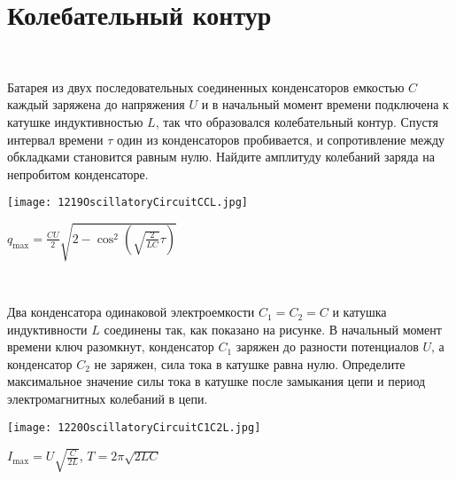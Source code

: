 \section{Колебательный контур}

\begin{ex}
\hspace{0pt} \\
\begin{minipage}{.65\textwidth}
Батарея из двух последовательных соединенных конденсаторов емкостью $C$ каждый заряжена до напряжения $U$ и в начальный момент времени подключена к катушке индуктивностью $L$, так что образовался колебательный контур. 
Спустя интервал времени $\tau$ один из конденсаторов пробивается, и сопротивление между обкладками становится равным нулю. 
Найдите амплитуду колебаний заряда на непробитом конденсаторе.
\end{minipage}
\begin{minipage}{.35\textwidth}
\centering
\texttt{[image: 1219OscillatoryCircuitCCL.jpg]}
\end{minipage}
\begin{ans}
$q_{\max} = \frac{CU}{2}\sqrt{2-\cos^2 \left( \sqrt{\frac{2}{LC}} \tau \right)}$
\end{ans}
\end{ex}

\begin{ex}
\hspace{0pt} \\
\begin{minipage}{.65\textwidth}
 Два конденсатора одинаковой электроемкости $C_1 = C_2 = C$ и катушка индуктивности $L$ соединены так, как показано на рисунке. 
В начальный момент времени ключ разомкнут, конденсатор $C_1$ заряжен до разности потенциалов $U$, а конденсатор $C_2$ не заряжен, 
сила тока в катушке равна нулю. Определите максимальное значение силы тока в катушке после замыкания цепи и период электромагнитных колебаний в цепи. 
\end{minipage}
\begin{minipage}{.35\textwidth}
\centering
\texttt{[image: 1220OscillatoryCircuitC1C2L.jpg]}
\end{minipage}
\begin{ans}
$I_{\max} = U \sqrt{\frac{C}{2L}}$, $T=2 \pi \sqrt{2LC}$
\end{ans}
\end{ex}

